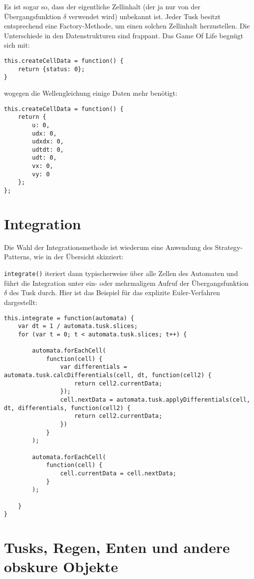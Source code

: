 \documentclass[11pt]{scrreprt} %
\theoremstyle{definition}
\begin{document}
Es ist sogar so, dass der eigentliche Zellinhalt (der ja nur von der Übergangsfunktion $\delta$ verwendet wird) unbekannt ist. Jeder Tusk besitzt entsprechend eine Factory-Methode, um einen solchen Zellinhalt herzustellen. Die Unterschiede in den Datenstrukturen sind frappant. Das Game Of Life begnügt sich mit:

\begin{lstlisting}
this.createCellData = function() {
	return {status: 0};
}
\end{lstlisting}

wogegen die Wellengleichung einige Daten mehr benötigt:
\begin{lstlisting}
this.createCellData = function() {
	return {
		u: 0,
		udx: 0,
		udxdx: 0,
		udtdt: 0,
		udt: 0,
		vx: 0,
		vy: 0
	};
};
\end{lstlisting}

\section{Integration}

Die Wahl der Integrationsmethode ist wiederum eine Anwendung des Strategy-Patterns, wie in der Übersicht skizziert:


{\tt integrate()} iteriert dann typischerweise über alle Zellen des Automaten und führt die Integration unter ein- oder mehrmaligem Aufruf der Übergangsfunktion $\delta$ des Tusk durch. Hier ist das Beispiel für das explizite Euler-Verfahren dargestellt:

\begin{lstlisting}
this.integrate = function(automata) {
	var dt = 1 / automata.tusk.slices;
	for (var t = 0; t < automata.tusk.slices; t++) {
		
		automata.forEachCell(
			function(cell) {
				var differentials = automata.tusk.calcDifferentials(cell, dt, function(cell2) {
					return cell2.currentData;
				});
				cell.nextData = automata.tusk.applyDifferentials(cell, dt, differentials, function(cell2) {
					return cell2.currentData;
				})
			}
		);
		
		automata.forEachCell(
			function(cell) {
				cell.currentData = cell.nextData;
			}
		);
		
	}
}
\end{lstlisting}


\section{Tusks, Regen, Enten und andere obskure Objekte}
\end{document}
